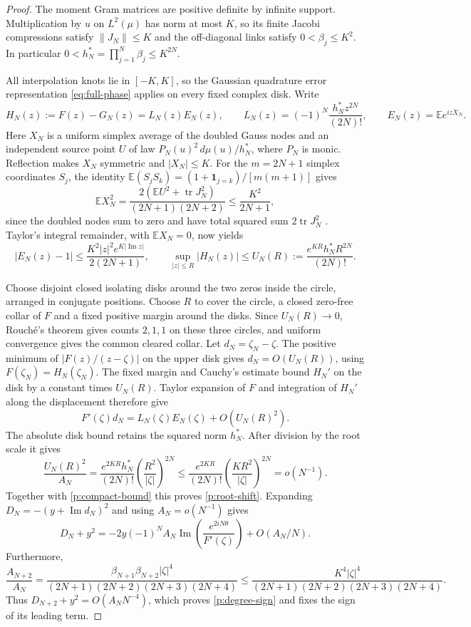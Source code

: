 \begin{proof}
The moment Gram matrices are positive definite by infinite support.
Multiplication by \(u\) on \(L^2(\mu)\) has norm at most \(K\), so
its finite Jacobi compressions satisfy \(\|J_N\|\le K\) and the
off-diagonal links satisfy \(0<\beta_j\le K^2\). In particular
\(0<h_N^*=\prod_{j=1}^N\beta_j\le K^{2N}\).

All interpolation knots lie in \([-K,K]\), so the Gaussian quadrature
error representation \eqref{eq:full-phase} applies on every fixed
complex disk. Write
\[
 H_N(z):=F(z)-G_N(z)=L_N(z)E_N(z),\qquad
 L_N(z)=(-1)^N\frac{h_N^*z^{2N}}{(2N)!},
 \qquad E_N(z)=\mathbb E e^{izX_N}.
\]
Here \(X_N\) is a uniform simplex average of the doubled Gauss
nodes and an independent source point \(U\) of law
\(P_N(u)^2\,d\mu(u)/h_N^*\), where \(P_N\) is monic. Reflection
makes \(X_N\) symmetric and \(|X_N|\le K\).
For the \(m=2N+1\) simplex coordinates \(S_j\), the identity
\(\mathbb E(S_j S_k)=(1+\mathbf 1_{j=k})/[m(m+1)]\) gives
\[
 \mathbb E X_N^2
   =\frac{2(\mathbb E U^2+\operatorname{tr} J_N^2)}{(2N+1)(2N+2)}
   \le \frac{K^2}{2N+1},
\]
since the doubled nodes sum to zero and have total squared sum
\(2\operatorname{tr}J_N^2\) \cite[\S 7, second moment]{vcd}.
Taylor's integral remainder, with
\(\mathbb E X_N=0\), now yields
\begin{equation}
 |E_N(z)-1|
 \le \frac{K^2|z|^2 e^{K|\operatorname{Im} z|}}{2(2N+1)},\qquad
 \sup_{|z|\le R}|H_N(z)|
 \le U_N(R):=\frac{e^{KR}h_N^*R^{2N}}{(2N)!}.
 \label{p:compact-bound}
\end{equation}

Choose disjoint closed isolating disks around the two zeros inside
the circle, arranged in conjugate positions. Choose \(R\) to
cover the circle, a closed zero-free collar of \(F\) and a fixed
positive margin around the disks. Since \(U_N(R)\to0\), Rouch\'e's
theorem gives counts \(2,1,1\) on these three circles, and uniform
convergence gives the common cleared collar. Let \(d_N=\zeta_N-\zeta\).
The positive minimum of \(|F(z)/(z-\zeta)|\) on the upper disk
gives \(d_N=O(U_N(R))\), using
\(F(\zeta_N)=H_N(\zeta_N)\). The fixed margin and Cauchy's
estimate bound \(H_N'\) on the disk by a constant times \(U_N(R)\).
Taylor expansion of \(F\) and integration of \(H_N'\) along the
displacement therefore give
\[
 F'(\zeta)d_N=L_N(\zeta)E_N(\zeta)+O(U_N(R)^2).
\]
The absolute disk bound retains the squared norm \(h_N^*\).
After division by the root scale it gives
\[
 \frac{U_N(R)^2}{A_N}
   =\frac{e^{2KR}h_N^*}{(2N)!}
       \left(\frac{R^2}{|\zeta|}\right)^{2N}
   \le \frac{e^{2KR}}{(2N)!}
       \left(\frac{KR^2}{|\zeta|}\right)^{2N}
   =o(N^{-1}).
\]
Together with \eqref{p:compact-bound} this proves
\eqref{p:root-shift}. Expanding \(D_N=-(y+\operatorname{Im}d_N)^2\)
and using \(A_N=o(N^{-1})\) gives
\[
 D_N+y^2=-2y(-1)^N A_N\operatorname{Im}
   \left(\frac{e^{2iN\theta}}{F'(\zeta)}\right)+O(A_N/N).
\]
Furthermore,
\[
 \frac{A_{N+2}}{A_N}
  =\frac{\beta_{N+1}\beta_{N+2}|\zeta|^4}
   {(2N+1)(2N+2)(2N+3)(2N+4)}
  \le \frac{K^4|\zeta|^4}{(2N+1)(2N+2)(2N+3)(2N+4)} .
\]
Thus \(D_{N+2}+y^2=O(A_NN^{-4})\), which proves
\eqref{p:degree-sign} and fixes the sign of its leading term.
\end{proof}

